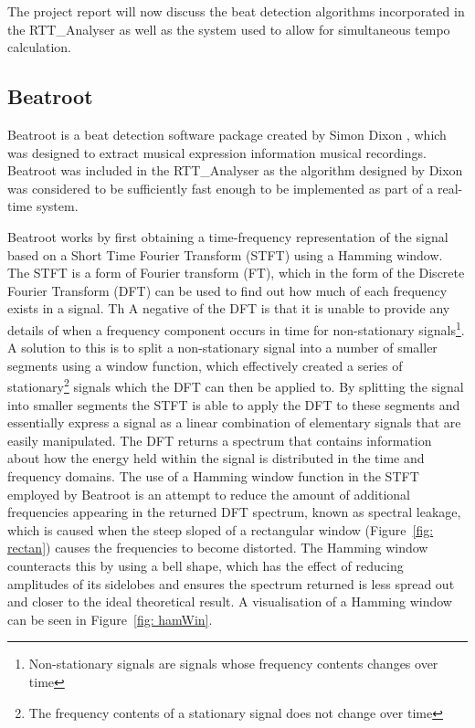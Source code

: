\documentclass[a4paper, 11pt]{article}
\begin{document}
The project report will now discuss the beat detection algorithms incorporated in the RTT\_Analyser as well as the system used to allow for simultaneous tempo calculation.  

\subsection{Beatroot}
Beatroot is a beat detection software package created by Simon Dixon \cite{dixon1}, which was designed to extract musical expression information musical recordings\cite{dixon3}. Beatroot was included in the RTT{\_}Analyser as the algorithm designed by Dixon was considered to be sufficiently fast enough to be implemented as part of a real-time system\cite{dixon4}.\par

Beatroot works by first obtaining a time-frequency representation of the signal based on a Short Time Fourier Transform (STFT) using a Hamming window\cite{dixon2}. The STFT is a form of Fourier transform (FT), which in the form of the Discrete Fourier Transform (DFT) can be used to find out how much of each frequency exists in a signal. Th A negative of the DFT is that it is unable to provide any details of when a frequency component occurs in time for non-stationary signals\footnote{Non-stationary signals are signals whose frequency contents changes over time\cite{polikapt2}}. A solution to this is to split a non-stationary signal into a number of smaller segments using a window function, which effectively created a series of stationary\footnote{The frequency contents of a stationary signal does not change over time} signals which the DFT can then be applied to. By splitting the signal into smaller segments the STFT is able to apply the DFT to these segments and essentially express a signal as a linear combination of elementary signals that are easily manipulated. The DFT returns a spectrum that contains information about how the energy held within the signal is distributed in the time and frequency domains\cite{tzane2}. The use of a Hamming window function in the STFT employed by Beatroot is an attempt to reduce the amount of additional frequencies appearing in the returned DFT spectrum, known as spectral leakage, which is caused when the steep sloped of a rectangular window (Figure~\ref{fig: rectan}) causes the frequencies to become distorted. The Hamming window counteracts this by using a bell shape, which has the effect of reducing amplitudes of its sidelobes\cite{lyons} and ensures the spectrum returned is less spread out and closer to the ideal theoretical result\cite{tzane2}. A visualisation of a Hamming window can be seen in Figure~\ref{fig: hamWin}. 
\end{document}
